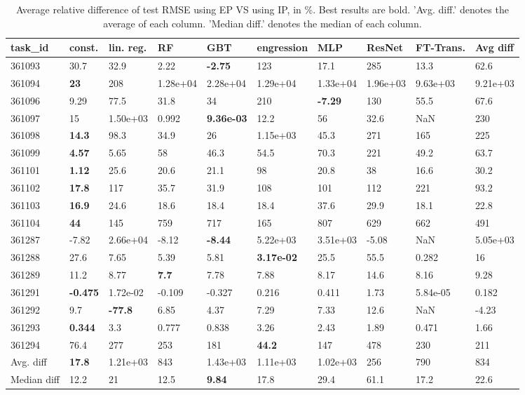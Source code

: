 \begin{table}[ht!]
\centering
\begingroup\footnotesize
\begin{tabular}{llllllllll}
  \hline
\hline
task\_id & const. & lin. reg. & RF & GBT & engression & MLP & ResNet & FT-Trans. & Avg diff \\ 
  \hline
361093 & 30.7 & 32.9 & 2.22 & \textbf{-2.75} & 123 & 17.1 & 285 & 13.3 & 62.6 \\ 
  361094 & \textbf{23} & 208 & 1.28e+04 & 2.28e+04 & 1.29e+04 & 1.33e+04 & 1.96e+03 & 9.63e+03 & 9.21e+03 \\ 
  361096 & 9.29 & 77.5 & 31.8 & 34 & 210 & \textbf{-7.29} & 130 & 55.5 & 67.6 \\ 
  361097 & 15 & 1.50e+03 & 0.992 & \textbf{9.36e-03} & 12.2 & 56 & 32.6 & NaN & 230 \\ 
  361098 & \textbf{14.3} & 98.3 & 34.9 & 26 & 1.15e+03 & 45.3 & 271 & 165 & 225 \\ 
  361099 & \textbf{4.57} & 5.65 & 58 & 46.3 & 54.5 & 70.3 & 221 & 49.2 & 63.7 \\ 
  361101 & \textbf{1.12} & 25.6 & 20.6 & 21.1 & 98 & 20.8 & 38 & 16.6 & 30.2 \\ 
  361102 & \textbf{17.8} & 117 & 35.7 & 31.9 & 108 & 101 & 112 & 221 & 93.2 \\ 
  361103 & \textbf{16.9} & 24.6 & 18.6 & 18.4 & 18.4 & 37.6 & 29.9 & 18.1 & 22.8 \\ 
  361104 & \textbf{44} & 145 & 759 & 717 & 165 & 807 & 629 & 662 & 491 \\ 
  361287 & -7.82 & 2.66e+04 & -8.12 & \textbf{-8.44} & 5.22e+03 & 3.51e+03 & -5.08 & NaN & 5.05e+03 \\ 
  361288 & 27.6 & 7.65 & 5.39 & 5.81 & \textbf{3.17e-02} & 25.5 & 55.5 & 0.282 & 16 \\ 
  361289 & 11.2 & 8.77 & \textbf{7.7} & 7.78 & 7.88 & 8.17 & 14.6 & 8.16 & 9.28 \\ 
  361291 & \textbf{-0.475} & 1.72e-02 & -0.109 & -0.327 & 0.216 & 0.411 & 1.73 & 5.84e-05 & 0.182 \\ 
  361292 & 9.7 & \textbf{-77.8} & 6.85 & 4.37 & 7.29 & 7.33 & 12.6 & NaN & -4.23 \\ 
  361293 & \textbf{0.344} & 3.3 & 0.777 & 0.838 & 3.26 & 2.43 & 1.89 & 0.471 & 1.66 \\ 
  361294 & 76.4 & 277 & 253 & 181 & \textbf{44.2} & 147 & 478 & 230 & 211 \\ 
   \hline
Avg. diff & \textbf{17.8} & 1.21e+03 & 843 & 1.43e+03 & 1.11e+03 & 1.02e+03 & 256 & 790 & 834 \\ 
  Median diff & 12.2 & 21 & 12.5 & \textbf{9.84} & 17.8 & 29.4 & 61.1 & 17.2 & 22.6 \\ 
   \hline
\hline
\end{tabular}
\endgroup
\caption{Average relative difference of test RMSE using EP VS using IP, in \%. 
                  Best results are bold. 
                  'Avg. diff.' denotes the average of each column.
                  'Median diff.' denotes the median of each column.} 
\label{TABLES/table_results_RMSE_num_and_cat_features_EP_VS_IP}
\end{table}
